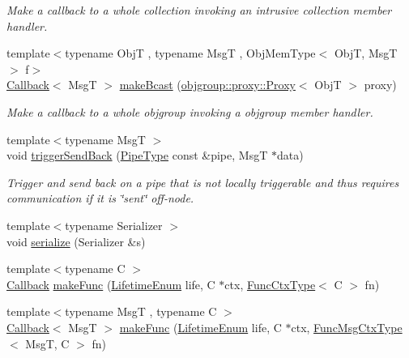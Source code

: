 \begin{DoxyCompactItemize}
\begin{DoxyCompactList}\small\item\em Make a callback to a whole collection invoking an intrusive collection member handler. \end{DoxyCompactList}\item 
{\footnotesize template$<$typename ObjT , typename MsgT , Obj\+Mem\+Type$<$ Obj\+T, Msg\+T $>$ f$>$ }\\\hyperlink{namespacevt_a57b238783d05de96bc2c4027f7073b7f}{Callback}$<$ MsgT $>$ \hyperlink{structvt_1_1pipe_1_1_pipe_manager_a4d561c17ce6861401a32892223e434c9}{make\+Bcast} (\hyperlink{structvt_1_1objgroup_1_1proxy_1_1_proxy}{objgroup\+::proxy\+::\+Proxy}$<$ ObjT $>$ proxy)
\begin{DoxyCompactList}\small\item\em Make a callback to a whole objgroup invoking a objgroup member handler. \end{DoxyCompactList}\item 
{\footnotesize template$<$typename MsgT $>$ }\\void \hyperlink{structvt_1_1pipe_1_1_pipe_manager_aaddd05d4eec8fbcbe8134f9c907a7306}{trigger\+Send\+Back} (\hyperlink{namespacevt_ac9852acda74d1896f48f406cd72c7bd3}{Pipe\+Type} const \&pipe, MsgT $\ast$data)
\begin{DoxyCompactList}\small\item\em Trigger and send back on a pipe that is not locally triggerable and thus requires communication if it is \char`\"{}sent\char`\"{} off-\/node. \end{DoxyCompactList}\item 
{\footnotesize template$<$typename Serializer $>$ }\\void \hyperlink{structvt_1_1pipe_1_1_pipe_manager_ae7b6be748d81eeeddb0cf84133bb8a7c}{serialize} (Serializer \&s)
\item 
{\footnotesize template$<$typename C $>$ }\\\hyperlink{namespacevt_a57b238783d05de96bc2c4027f7073b7f}{Callback} \hyperlink{structvt_1_1pipe_1_1_pipe_manager_a2b956c73ec6f6d03621bfe5e6a96c782}{make\+Func} (\hyperlink{namespacevt_1_1pipe_acb42b284378c0fdac1d7c6335dc26f58}{Lifetime\+Enum} life, C $\ast$ctx, \hyperlink{structvt_1_1pipe_1_1_pipe_manager_base_ad8463823b6b4cfdb67c119d6d22e3bac}{Func\+Ctx\+Type}$<$ C $>$ fn)
\item 
{\footnotesize template$<$typename MsgT , typename C $>$ }\\\hyperlink{namespacevt_a57b238783d05de96bc2c4027f7073b7f}{Callback}$<$ MsgT $>$ \hyperlink{structvt_1_1pipe_1_1_pipe_manager_aeade0c95a974823a05ba925167c82889}{make\+Func} (\hyperlink{namespacevt_1_1pipe_acb42b284378c0fdac1d7c6335dc26f58}{Lifetime\+Enum} life, C $\ast$ctx, \hyperlink{structvt_1_1pipe_1_1_pipe_manager_base_a73fdf82ece0411b3dc644c99b763f7a9}{Func\+Msg\+Ctx\+Type}$<$ MsgT, C $>$ fn)
\end{DoxyCompactItemize}
